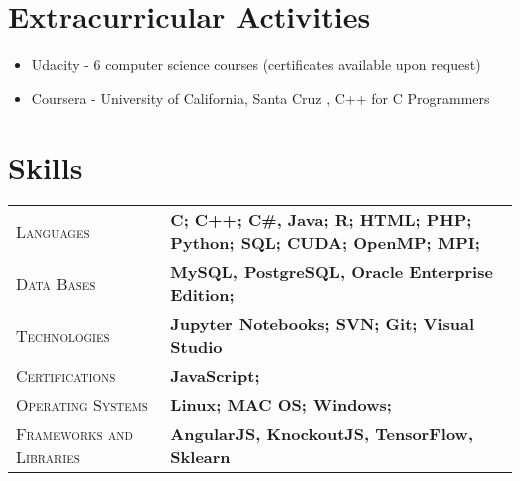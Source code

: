 \documentclass[10pt, a4paper, oneside, final]{scrartcl} %
\newcommand{\gray}{\rowcolor[gray]{.90}} %
\begin{document}
\section{Extracurricular Activities}
\begin{center}
\begin{itemize}\itemsep1.5pt
\item Udacity - 6 computer science courses (certificates available upon request)
\item Coursera - University of California, Santa Cruz , C++ for C Programmers

\end{itemize}
\end{center}


\section{Skills}

\begin{center}
\begin{tabularx}{1.0\linewidth}{>{\raggedleft\scshape}p{3.2cm}X}
\gray Languages & \textbf{C; C++; C\#, Java; R; HTML; PHP; Python; SQL; CUDA; OpenMP; MPI;}\\
\gray Data Bases & \textbf{MySQL, PostgreSQL, Oracle Enterprise Edition;}\\
\gray Technologies & \textbf{Jupyter Notebooks; SVN; Git; Visual Studio}\\
\gray Certifications & \textbf{JavaScript;}\\
\gray Operating Systems & \textbf{Linux; MAC OS; Windows;}\\
\gray Frameworks and Libraries & \textbf{AngularJS, KnockoutJS, TensorFlow, Sklearn}\\
\end{tabularx}
\end{center}
\end{document}
